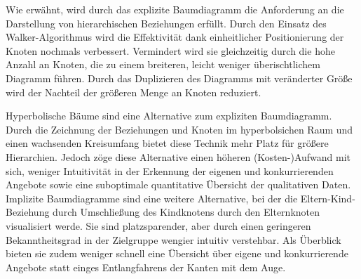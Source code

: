 \documentclass[usegeometry=true]{scrartcl}
\begin{document}
Wie erwähnt, wird durch das explizite Baumdiagramm die Anforderung an die Darstellung von hierarchischen Beziehungen erfüllt.
Durch den Einsatz des Walker-Algorithmus wird die Effektivität dank einheitlicher Positionierung der Knoten nochmals verbessert.%
Vermindert wird sie gleichzeitig durch die hohe Anzahl an Knoten, die zu einem breiteren, leicht weniger überischtlichem Diagramm führen. 
Durch das Duplizieren des Diagramms mit veränderter Größe wird der Nachteil der größeren Menge an Knoten reduziert.

Hyperbolische Bäume sind eine Alternative zum expliziten Baumdiagramm. 
Durch die Zeichnung der Beziehungen und Knoten im hyperbolsichen Raum und einen wachsenden Kreisumfang bietet diese Technik mehr Platz für größere Hierarchien.%
Jedoch zöge diese Alternative einen höheren (Kosten-)Aufwand mit sich, weniger Intuitivität in der Erkennung der eigenen und konkurrierenden Angebote sowie eine suboptimale quantitative Übersicht der qualitativen Daten. 
Implizite Baumdiagramme sind eine weitere Alternative, bei der die Eltern-Kind-Beziehung durch Umschließung des Kindknotens durch den Elternknoten visualisiert werde.%
Sie sind platzsparender, aber durch einen geringeren Bekanntheitsgrad in der Zielgruppe wengier intuitiv verstehbar. 
Als Überblick bieten sie zudem weniger schnell eine Übersicht über eigene und konkurrierende Angebote statt einges Entlangfahrens der Kanten mit dem Auge.


\end{document}
